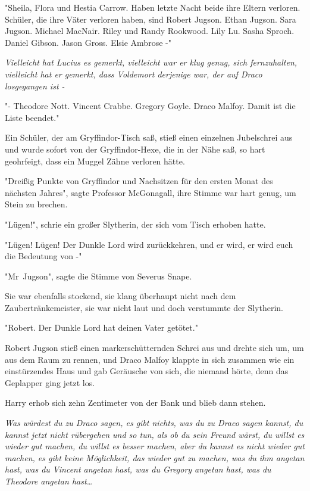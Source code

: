 {"Sheila, Flora und Hestia Carrow. Haben letzte Nacht beide ihre Eltern verloren. Schüler, die ihre Väter verloren haben, sind Robert Jugson. Ethan Jugson. Sara Jugson. Michael MacNair. Riley und Randy Rookwood. Lily Lu. Sasha Sproch. Daniel Gibson. Jason Gross. Elsie Ambrose -"

\emph{Vielleicht hat Lucius es gemerkt, vielleicht war er klug genug, sich fernzuhalten, vielleicht hat er gemerkt, dass Voldemort derjenige war, der auf Draco losgegangen ist -}

"- Theodore Nott. Vincent Crabbe. Gregory Goyle. Draco Malfoy. Damit ist die Liste beendet."

Ein Schüler, der am Gryffindor-Tisch saß, stieß einen einzelnen Jubelschrei aus und wurde sofort von der Gryffindor-Hexe, die in der Nähe saß, so hart geohrfeigt, dass ein Muggel Zähne verloren hätte.

"Dreißig Punkte von Gryffindor und Nachsitzen für den ersten Monat des nächsten Jahres", sagte Professor McGonagall, ihre Stimme war hart genug, um Stein zu brechen.

"Lügen!", schrie ein großer Slytherin, der sich vom Tisch erhoben hatte.

"Lügen! Lügen! Der Dunkle Lord wird zurückkehren, und er wird, er wird euch die Bedeutung von -"

"Mr~Jugson", sagte die Stimme von Severus Snape.

Sie war ebenfalls stockend, sie klang überhaupt nicht nach dem Zaubertränkemeister, sie war nicht laut und doch verstummte der Slytherin.

"Robert. Der Dunkle Lord hat deinen Vater getötet."

Robert Jugson stieß einen markerschütternden Schrei aus und drehte sich um, um aus dem Raum zu rennen, und Draco Malfoy klappte in sich zusammen wie ein einstürzendes Haus und gab Geräusche von sich, die niemand hörte, denn das Geplapper ging jetzt los.

Harry erhob sich zehn Zentimeter von der Bank und blieb dann stehen.

\emph{Was würdest du zu Draco sagen, es gibt nichts, was du zu Draco sagen kannst, du kannst jetzt nicht rübergehen und so tun, als ob du sein Freund wärst, du willst es wieder gut machen, du willst es besser machen, aber du kannst es nicht wieder gut machen, es gibt keine Möglichkeit, das wieder gut zu machen, was du ihm angetan hast, was du Vincent angetan hast, was du Gregory angetan hast, was du Theodore angetan hast…}

}
